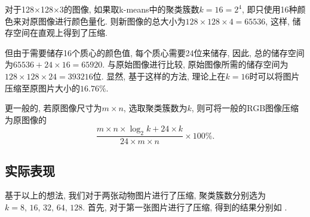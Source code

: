 \documentclass[lang=cn,11pt]{elegantpaper}
\begin{document}
对于128$\times$128$\times$3的图像, 如果取k-means中的聚类簇数$k=16=2^4$, 即只使用16种颜色来对原图像进行颜色量化. 则新图像的总大小为$128\times128\times4 = 65536$, 这样, 储存空间在直观上得到了压缩. 

但由于需要储存16个质心的颜色值, 每个质心需要24位来储存, 因此, 总的储存空间为$65536 + 24 \times 16 = 65920$. 与原始图像进行比较, 原始图像所需的储存空间为$128 \times 128 \times 24 = 393216$位. 显然, 基于这样的方法, 理论上在$k=16$时可以将图片压缩至原图片大小的$16.76\%$. 

更一般的, 若原图像尺寸为$m\times n$, 选取聚类簇数为$k$, 则可将一般的RGB图像压缩为原图像的$$\frac{m\times n \times \log_2k+24\times k}{24\times m\times n}\times 100\%.$$
\subsection{实际表现}
基于以上的想法, 我们对于两张动物图片进行了压缩, 聚类簇数分别选为$k=8,\,16,\,32,\,64,\,128$. 首先, 对于第一张图片进行了压缩, 得到的结果分别如 .
\end{document}
